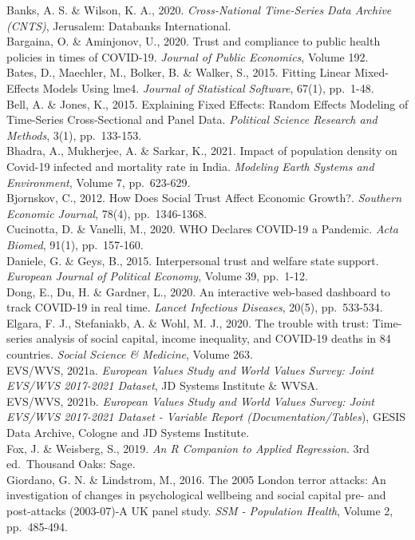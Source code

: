 \documentclass[
  12pt,
]{article}
\begin{document}
Banks, A. S. \& Wilson, K. A., 2020. \emph{Cross-National Time-Series Data Archive (CNTS)}, Jerusalem: Databanks International.\\
Bargaina, O. \& Aminjonov, U., 2020. Trust and compliance to public health policies in times of COVID-19. \emph{Journal of Public Economics}, Volume 192.\\
Bates, D., Maechler, M., Bolker, B. \& Walker, S., 2015. Fitting Linear Mixed-Effects Models Using lme4. \emph{Journal of Statistical Software}, 67(1), pp.~1-48.\\
Bell, A. \& Jones, K., 2015. Explaining Fixed Effects: Random Effects Modeling of Time-Series Cross-Sectional and Panel Data. \emph{Political Science Research and Methods}, 3(1), pp.~133-153.\\
Bhadra, A., Mukherjee, A. \& Sarkar, K., 2021. Impact of population density on Covid-19 infected and mortality rate in India. \emph{Modeling Earth Systems and Environment}, Volume 7, pp.~623-629.\\
Bjornskov, C., 2012. How Does Social Trust Affect Economic Growth?. \emph{Southern Economic Journal}, 78(4), pp.~1346-1368.\\
Cucinotta, D. \& Vanelli, M., 2020. WHO Declares COVID-19 a Pandemic. \emph{Acta Biomed}, 91(1), pp.~157-160.\\
Daniele, G. \& Geys, B., 2015. Interpersonal trust and welfare state support. \emph{European Journal of Political Economy}, Volume 39, pp.~1-12.\\
Dong, E., Du, H. \& Gardner, L., 2020. An interactive web-based dashboard to track COVID-19 in real time. \emph{Lancet Infectious Diseases}, 20(5), pp.~533-534.\\
Elgara, F. J., Stefaniakb, A. \& Wohl, M. J., 2020. The trouble with trust: Time-series analysis of social capital, income inequality, and COVID-19 deaths in 84 countries. \emph{Social Science \& Medicine}, Volume 263.\\
EVS/WVS, 2021a. \emph{European Values Study and World Values Survey: Joint EVS/WVS 2017-2021 Dataset}, JD Systems Institute \& WVSA.\\
EVS/WVS, 2021b. \emph{European Values Study and World Values Survey: Joint EVS/WVS 2017-2021 Dataset - Variable Report (Documentation/Tables}), GESIS Data Archive, Cologne and JD Systems Institute.\\
Fox, J. \& Weisberg, S., 2019. \emph{An R Companion to Applied Regression}. 3rd ed.~Thousand Oaks: Sage.\\
Giordano, G. N. \& Lindstrom, M., 2016. The 2005 London terror attacks: An investigation of changes in psychological wellbeing and social capital pre- and post-attacks (2003-07)-A UK panel study. \emph{SSM - Population Health}, Volume 2, pp.~485-494.\\
\end{document}
